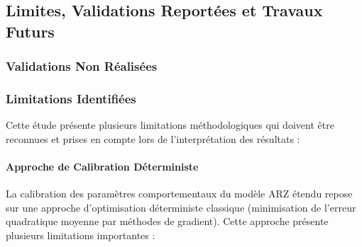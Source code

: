 
\subsection{Limites, Validations Reportées et Travaux Futurs}
\label{sec:limites_travaux_futurs}

\subsubsection{Validations Non Réalisées}
\label{subsec:validations_non_realisees}

\subsubsection{Limitations Identifiées}
\label{subsec:limitations_identifiees}
Cette étude présente plusieurs limitations méthodologiques qui doivent être reconnues et prises en compte lors de l'interprétation des résultats :

\paragraph{Approche de Calibration Déterministe}
La calibration des paramètres comportementaux du modèle ARZ étendu repose sur une approche d'optimisation déterministe classique (minimisation de l'erreur quadratique moyenne par méthodes de gradient). Cette approche présente plusieurs limitations importantes :

